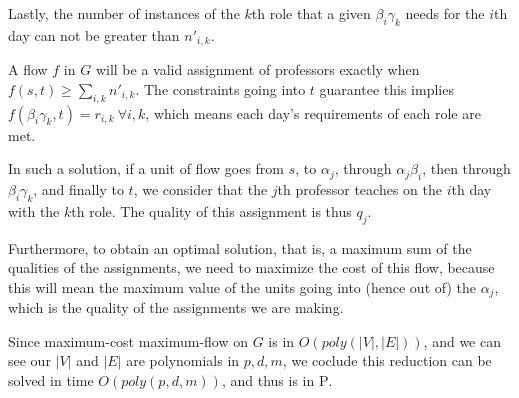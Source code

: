 Lastly, the number of instances of the $k$th role that a given $\beta_i \gamma_k$ needs for the $i$th day can not be greater than $n'_{i, k}$.

A flow $f$ in $G$ will be a valid assignment of professors exactly when $f(s, t) \ge \sum_{i, k} n'_{i, k}$. The constraints going into $t$ guarantee this implies $f(\beta_i \gamma_k, t) = r_{i, k}\ \forall i, k$, which means each day's requirements of each role are met.

In such a solution, if a unit of flow goes from $s$, to $\alpha_j$, through $\alpha_j \beta_i$, then through $\beta_i \gamma_k$, and finally to $t$, we consider that the $j$th professor teaches on the $i$th day with the $k$th role. The quality of this assignment is thus $q_j$.

Furthermore, to obtain an optimal solution, that is, a maximum sum of the qualities of the assignments, we need to maximize the cost of this flow, because this will mean the maximum value of the units going into (hence out of) the $\alpha_j$, which is the quality of the assignments we are making.

Since maximum-cost maximum-flow on $G$ is in $O(poly(|V|, |E|))$, and we can see our $|V|$ and $|E|$ are polynomials in $p, d, m$, we coclude this reduction can be solved in time $O(poly(p, d, m))$, and thus is in \textsc{P}.
